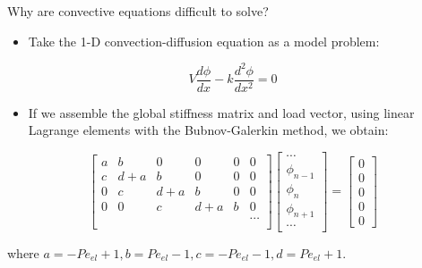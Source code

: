 \documentclass{beamer}
\begin{document}
\begin{frame}{Why are convective equations difficult to solve?}

\begin{itemize}
\item Take the 1-D convection-diffusion equation as a model problem:
\end{itemize}

\begin{equation}
V\frac{d\phi}{dx}-k\frac{d^2\phi}{dx^2}=0
\end{equation}

\begin{itemize}
\item If we assemble the global stiffness matrix and load vector, using linear Lagrange elements with the Bubnov-Galerkin method, we obtain:
\end{itemize}

\begin{equation}
\begin{bmatrix} a & b & 0 & 0 & 0 & 0\\
			c & d + a & b & 0 & 0 & 0\\
			0 & c & d + a & b & 0 & 0\\
			0 & 0 & c & d + a & b & 0\\
			 & & & &  & \cdots \\\end{bmatrix}
\begin{bmatrix}\cdots \\ \phi_{n-1}\\\phi_{n}\\\phi_{n+1}\\\cdots\end{bmatrix}=
\begin{bmatrix}0 \\ 0 \\ 0 \\ 0 \\ 0\end{bmatrix}
\end{equation}

where \(a=-Pe_{el}+1, b=Pe_{el}-1, c=-Pe_{el}-1, d=Pe_{el}+1\). 

\end{frame}

\end{document}
